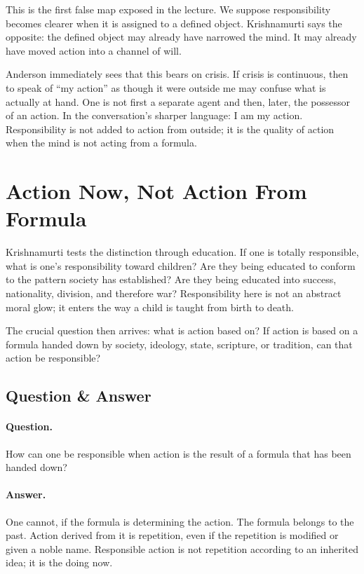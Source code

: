 This is the first false map exposed in the lecture. We suppose responsibility becomes clearer when it is assigned to a defined object. Krishnamurti says the opposite: the defined object may already have narrowed the mind. It may already have moved action into a channel of will.

Anderson immediately sees that this bears on crisis. If crisis is continuous, then to speak of ``my action'' as though it were outside me may confuse what is actually at hand. One is not first a separate agent and then, later, the possessor of an action. In the conversation's sharper language: I am my action. Responsibility is not added to action from outside; it is the quality of action when the mind is not acting from a formula.

\section{Action Now, Not Action From Formula}

Krishnamurti tests the distinction through education. If one is totally responsible, what is one's responsibility toward children? Are they being educated to conform to the pattern society has established? Are they being educated into success, nationality, division, and therefore war? Responsibility here is not an abstract moral glow; it enters the way a child is taught from birth to death.

The crucial question then arrives: what is action based on? If action is based on a formula handed down by society, ideology, state, scripture, or tradition, can that action be responsible?

\subsection{Question \& Answer}

\paragraph{Question.}
How can one be responsible when action is the result of a formula that has been handed down?

\paragraph{Answer.}
One cannot, if the formula is determining the action. The formula belongs to the past. Action derived from it is repetition, even if the repetition is modified or given a noble name. Responsible action is not repetition according to an inherited idea; it is the doing now.

